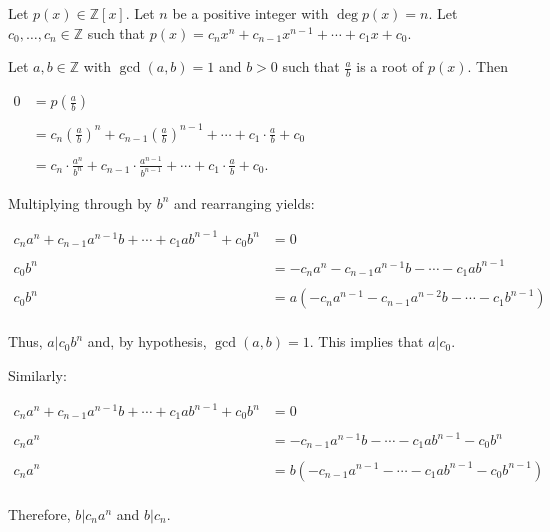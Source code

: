 \documentclass[12pt]{article}
\begin{document}

Let $p(x) \in \mathbb{Z}[x]$.  Let $n$ be a positive integer with $\operatorname{deg} p(x)=n$.  Let $c_0, \ldots , c_n \in \mathbb{Z}$ such that $p(x)=c_nx^n+c_{n-1}x^{n-1}+\cdots +c_1x+c_0$.

Let $a,b \in \mathbb{Z}$ with $\operatorname{gcd}(a,b)=1$ and $b>0$ such that $\displaystyle \frac{a}{b}$ is a root of $p(x)$. Then

\begin{center}
$\begin{array}{ll}
0 & \displaystyle =p\left( \frac{a}{b} \right) \\
\\
& \displaystyle =c_n \left( \frac{a}{b} \right)^n+c_{n-1} \left( \frac{a}{b} \right)^{n-1} +\cdots +c_1 \cdot \frac{a}{b} +c_0 \\
\\
& \displaystyle =c_n \cdot \frac{a^n}{b^n}+c_{n-1} \cdot \frac{a^{n-1}}{b^{n-1}} +\cdots +c_1 \cdot \frac{a}{b} +c_0. \end{array}$
\end{center}

Multiplying through by $b^n$ and rearranging yields:

\begin{center}
$\begin{array}{rl}
c_na^n+c_{n-1}a^{n-1}b+\cdots +c_1ab^{n-1} +c_0b^n & =0 \\
\\
c_0b^n & =-c_na^n-c_{n-1}a^{n-1}b -\cdots -c_1ab^{n-1} \\
\\
c_0b^n & =a \left( -c_na^{n-1}-c_{n-1}a^{n-2}b -\cdots -c_1b^{n-1} \right) \\
\end{array}$
\end{center}

Thus, $a|c_0b^n$ and, by hypothesis, $\operatorname{gcd}(a,b)=1$.  This implies that $a|c_0$.

Similarly:

\begin{center}
$\begin{array}{rl}
c_na^n+c_{n-1}a^{n-1} b+\cdots +c_1ab^{n-1} +c_0b^n & =0 \\
\\
c_na^n & =-c_{n-1}a^{n-1} b-\cdots -c_1ab^{n-1} -c_0b^n \\
\\
c_na^n & =b \left( -c_{n-1}a^{n-1} -\cdots -c_1ab^{n-1} -c_0b^{n-1} \right) \\
\end{array}$
\end{center}

Therefore, $b|c_na^n$ and $b|c_n$.
\end{document}
